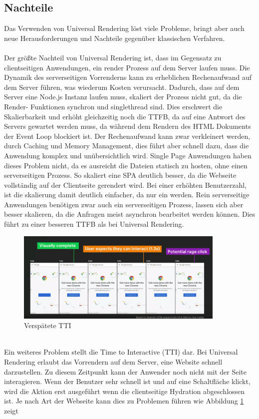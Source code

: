\documentclass[runningheads]{llncs}
\begin{document}
\subsection{Nachteile}
\label{subsec:Nachteile}
Das Verwenden von Universal Rendering löst viele Probleme, 
bringt aber auch neue Herausforderungen und 
Nachteile gegenüber klassischen Verfahren.
\\
\\
Der größte Nachteil von Universal Rendering ist, 
dass im Gegensatz zu clientseitigen Anwendungen, 
ein render Prozess auf dem Server laufen muss. 
Die Dynamik des serverseitigen Vorrenderns 
kann zu erheblichen Rechenaufwand auf dem Server führen, 
was wiederum Kosten verursacht. 
Dadurch, dass auf dem Server eine Node.js Instanz laufen muss, 
skaliert der Prozess nicht gut, 
da die Render- Funktionen synchron und singlethread sind. 
Dies erschwert die Skalierbarkeit und erhöht gleichzeitig noch die TTFB, 
da auf eine Antwort des Servers gewartet werden muss, 
da während dem Rendern des HTML Dokuments der Event Loop blockiert ist. 
Der Rechenaufwand kann zwar verkleinert werden, 
durch Caching und Memory Management, 
dies führt aber schnell dazu, 
dass die Anwendung komplex und unübersichtlich wird. 
Single Page Anwendungen haben dieses Problem nicht, 
da es ausreicht die Dateien statisch zu hosten, 
ohne einen serverseitigen Prozess. 
So skaliert eine SPA deutlich besser, 
da die Webseite vollständig auf der Clientseite gerendert wird.  
Bei einer erhöhten Benutzerzahl, 
ist die skalierung damit deutlich einfacher, 
da nur ein werden. 
Rein serverseitige Anwendungen benötigen zwar auch ein serverseitigen Prozess, 
lassen sich aber besser skalieren, 
da die Anfragen meist asynchron bearbeitet werden können. 
Dies führt zu einer besseren TTFB als bei Universal Rendering.
\begin{figure}[h]
  \centering
  \includegraphics[width=10cm]{images/TimeToInteractive}
  \caption{Verspätete TTI \cite{osmani_2019}}
  \label{Verspätete TTI}
\end{figure}
\\
Ein weiteres Problem stellt die Time to Interactive (TTI) dar. 
Bei Universal Rendering erlaubt das Vorrendern auf dem Server, 
eine Website schnell darzustellen. 
Zu diesem Zeitpunkt kann der Anwender noch nicht mit der Seite interagieren. 
Wenn der Benutzer sehr schnell ist und auf eine Schaltfläche klickt, 
wird die Aktion erst ausgeführt wenn die clientseitige Hydration abgeschlossen ist. 
Je nach Art der Webseite kann dies zu Problemen führen wie Abbildung \ref{Verspätete TTI} zeigt
\end{document}
